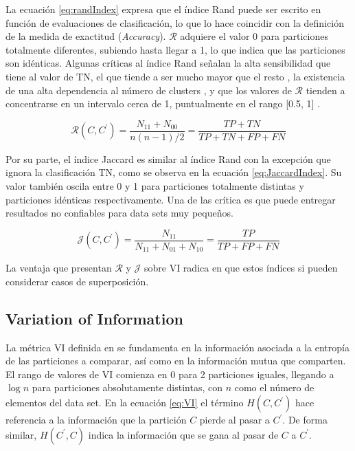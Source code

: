 La ecuaci\'on \ref{eq:randIndex} expresa que el \'indice Rand puede ser escrito en funci\'on de evaluaciones de clasificaci\'on, lo que lo hace coincidir con la definici\'on de la medida de exactitud ({\it Accuracy}). $\mathcal{R}$ adquiere el valor 0 para particiones totalmente diferentes, subiendo hasta llegar a 1, lo que indica que las particiones son id\'enticas. Algunas cr\'iticas al \'indice Rand se\~nalan la alta sensibilidad que tiene al valor de TN, el que tiende a ser mucho mayor que el resto , la existencia de una alta dependencia al n\'umero de clusters , y que los valores de $\mathcal{R}$ tienden a concentrarse en un intervalo cerca de 1, puntualmente en el rango [0.5, 1] .

\begin{equation}
\mathcal{R}(C,C^{\prime}) = \frac{N_{11} + N_{00}}{n(n-1)/2} = \frac{TP + TN}{TP + TN + FP + FN}
\label{eq:randIndex}
\end{equation}

Por su parte, el \'indice Jaccard es similar al \'indice Rand con la excepci\'on que ignora la clasificaci\'on TN, como se observa en la ecuaci\'on \ref{eq:JaccardIndex}. Su valor tambi\'en oscila entre 0 y 1 para particiones totalmente distintas y particiones id\'enticas respectivamente. Una de las cr\'itica es que puede entregar resultados no confiables para data sets muy peque\~nos.

\begin{equation}
\mathcal{J}(C,C^{\prime}) = \frac{N_{11}}{N_{11} + N_{01} + N_{10}} = \frac{TP}{TP + FP + FN}
\label{eq:JaccardIndex}
\end{equation}

La ventaja que presentan $\mathcal{R}$ y $\mathcal{J}$ sobre VI radica en que estos \'indices si pueden considerar casos de superposici\'on.

\subsection{Variation of Information}
La m\'etrica VI definida en \citet{meilua2007comparing} se fundamenta en la informaci\'on asociada a la entrop\'ia de las particiones a comparar, as\'i como en la informaci\'on mutua que comparten. El rango de valores de VI comienza en 0 para 2 particiones iguales, llegando a $\log n$ para particiones absolutamente distintas, con $n$ como el n\'umero de elementos del data set. En la ecuaci\'on \ref{eq:VI} el t\'ermino $H(C,C^{\prime})$ hace referencia a la informaci\'on que la partici\'on $C$ pierde al pasar a $C^{\prime}$. De forma similar, $H(C^{\prime},C)$ indica la informaci\'on que se gana al pasar de $C$ a $C^{\prime}$.

